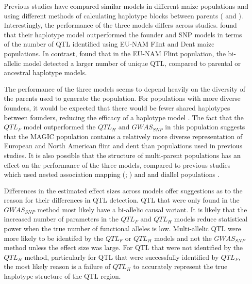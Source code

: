\documentclass[article,9pt,twocolumn,twoside]{rilabRxiv}
\begin{document}
Previous studies have compared similar models in different maize populations and using different methods of calculating haplotype blocks between parents (\cite{Leroux} and \cite{Giraud} \cite{Garin}).
Interestingly, the performance of the three models differs across studies. \cite{Giraud} found that their haplotype model outperformed the founder and SNP models in terms of the number of QTL identified using EU-NAM Flint and Dent maize populations. In contrast, \cite{Garin2} found that in the EU-NAM Flint population, the bi-allelic model detected a larger number of unique QTL, compared to parental or ancestral haplotype models.

The performance of the three models seems to depend heavily on the diversity of the parents used to generate the population.
For populations with more diverse founders, it would be expected that there would be fewer shared haplotypes between founders, reducing the efficacy of a haplotype model \cite{Giraud}.
The fact that the $QTL_F$ model outperformed the $QTL_H$ and $GWAS_{SNP}$ in this population suggests that the MAGIC population contains a relatively more diverse representation of European and North American flint and dent than populations used in previous studies.
It is also possible that the structure of multi-parent populations has an effect on the performance of the three models, compared to previous studies which used nested association mapping (\cite{Giraud}; \cite{Garin2}) and and diallel populations \cite{Bardol}.

Differences in the estimated effect sizes across models offer suggestions as to the reason for their differences in QTL detection.
QTL that were only found in the $GWAS_{SNP}$ method most likely have a bi-allelic causal variant.
It is likely that the increased number of parameters in the $QTL_F$ and $QTL_H$ models reduce statistical power when the true number of functional alleles is low.
Multi-allelic QTL were more likely to be identifed by the $QTL_F$ or $QTL_H$ models and not the $GWAS_{SNP}$ method unless the effect size was large.
For QTL that were not identified by  the $QTL_H$ method, particularly for QTL that were successfully identified by $QTL_F$, the most likely reason is a failure of $QTL_H$ to accurately represent the true haplotype structure of the QTL region.
\end{document}
